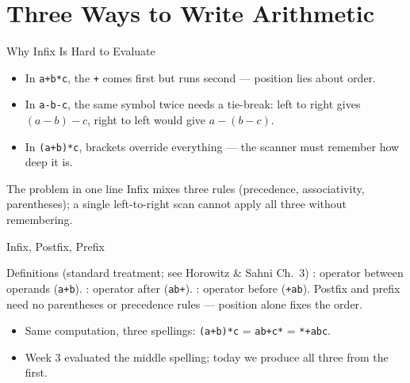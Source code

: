 \documentclass[aspectratio=169]{beamer}
\begin{document}

\section{Three Ways to Write Arithmetic}


\begin{frame}{Why Infix Is Hard to Evaluate}
  \begin{itemize}
    \item In \texttt{a+b*c}, the \texttt{+} comes first but runs second ---
      position lies about order.
    \item In \texttt{a-b-c}, the same symbol twice needs a tie-break: left to
      right gives $(a-b)-c$, right to left would give $a-(b-c)$.
    \item In \texttt{(a+b)*c}, brackets override everything --- the scanner
      must remember how deep it is.
  \end{itemize}
  \begin{exampleblock}{The problem in one line}
    Infix mixes three rules (precedence, associativity, parentheses); a
    single left-to-right scan cannot apply all three without remembering.
  \end{exampleblock}
\end{frame}

\begin{frame}{Infix, Postfix, Prefix}
  \begin{block}{Definitions (standard treatment; see Horowitz \& Sahni Ch.~3)
    \cite{HorowitzSahni2008_fundamentals_data_structures}}
    : operator between operands (\texttt{a+b}). :
    operator after (\texttt{ab+}). : operator before
    (\texttt{+ab}). Postfix and prefix need no parentheses or precedence
    rules --- position alone fixes the order.
  \end{block}
  \begin{itemize}
    \item Same computation, three spellings: \texttt{(a+b)*c} =
      \texttt{ab+c*} = \texttt{*+abc}.
    \item Week 3 evaluated the middle spelling; today we produce all three
      from the first.
  \end{itemize}
\end{frame}
\end{document}
